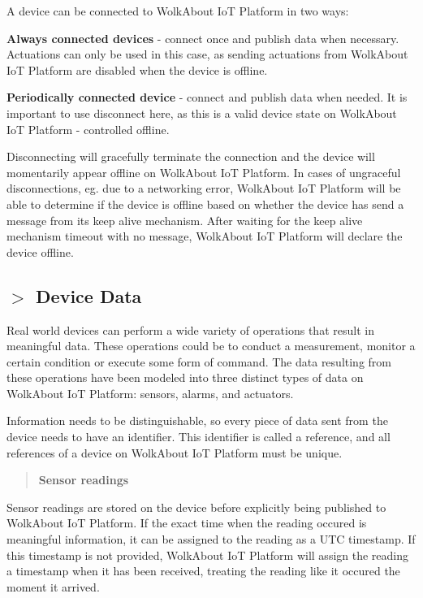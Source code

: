 A device can be connected to Wolk\+About IoT Platform in two ways\+:


\begin{DoxyItemize}
\item {\bfseries Always connected devices} -\/ connect once and publish data when necessary. Actuations can only be used in this case, as sending actuations from Wolk\+About IoT Platform are disabled when the device is offline.
\item {\bfseries Periodically connected device} -\/ connect and publish data when needed. It is important to use disconnect here, as this is a valid device state on Wolk\+About IoT Platform -\/ controlled offline.
\end{DoxyItemize}

Disconnecting will gracefully terminate the connection and the device will momentarily appear offline on Wolk\+About IoT Platform. In cases of ungraceful disconnections, eg. due to a networking error, Wolk\+About IoT Platform will be able to determine if the device is offline based on whether the device has send a message from its keep alive mechanism. After waiting for the keep alive mechanism timeout with no message, Wolk\+About IoT Platform will declare the device offline.

\subsection*{$>$ Device Data}

Real world devices can perform a wide variety of operations that result in meaningful data. These operations could be to conduct a measurement, monitor a certain condition or execute some form of command. The data resulting from these operations have been modeled into three distinct types of data on Wolk\+About IoT Platform\+: sensors, alarms, and actuators.

Information needs to be distinguishable, so every piece of data sent from the device needs to have an identifier. This identifier is called a reference, and all references of a device on Wolk\+About IoT Platform must be unique.

\label{_sensor-readings}%
 \begin{quote}
{\bfseries Sensor readings} \end{quote}
Sensor readings are stored on the device before explicitly being published to Wolk\+About IoT Platform. If the exact time when the reading occured is meaningful information, it can be assigned to the reading as a U\+TC timestamp. If this timestamp is not provided, Wolk\+About IoT Platform will assign the reading a timestamp when it has been received, treating the reading like it occured the moment it arrived.


